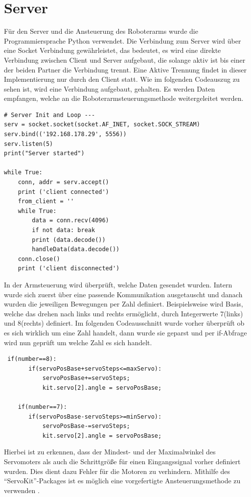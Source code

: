\documentclass[12pt,					%
							 oneside,			%
							 a4paper,			%
							 halfparskip,		%
							 liststotoc,			%
							 bibtotoc,			%
							 fleqn,				%
							 pointlessnumbers]	%
							 {scrreprt}
\begin{document}
\section{Server}
Für den Server und die Ansteuerung des Roboterarms wurde die Programmiersprache Python verwendet\cite{PiHandbuch}. Die Verbindung zum Server wird über eine Socket Verbindung gewährleistet, das bedeutet, es wird eine direkte Verbindung zwischen Client und Server aufgebaut, die solange aktiv ist bis einer der beiden Partner die Verbindung trennt. Eine Aktive Trennung findet in dieser Implementierung nur durch den Client statt. Wie im folgenden Codeauszug zu sehen ist, wird eine Verbindung aufgebaut, gehalten. Es werden Daten empfangen, welche an die Roboterarmsteuerungsmethode weitergeleitet werden.
\begin{lstlisting}
# Server Init and Loop ---
serv = socket.socket(socket.AF_INET, socket.SOCK_STREAM)
serv.bind(('192.168.178.29', 5556))
serv.listen(5)
print("Server started")

while True:
    conn, addr = serv.accept()
    print ('client connected')
    from_client = ''
    while True:
        data = conn.recv(4096)
        if not data: break
        print (data.decode())
        handleData(data.decode())
    conn.close()
    print ('client disconnected')
\end{lstlisting}


In der Armsteuerung wird überprüft, welche Daten gesendet wurden. Intern wurde sich zuerst über eine passende Kommunikation ausgetauscht und danach wurden die jeweiligen Bewegungen per Zahl definiert. Beispielsweise wird Basis, welche das drehen nach links und rechts ermöglicht, durch Integerwerte 7(links) und 8(rechts) definiert. Im folgenden Codeausschnitt wurde vorher überprüft ob es sich wirklich um eine Zahl handelt, dann wurde sie geparst und per \glqq{}if\grqq{}-Abfrage wird nun geprüft um welche Zahl es sich handelt. 
\newpage
\begin{lstlisting}
 if(number==8):
       if(servoPosBase+servoSteps<=maxServo):           
           servoPosBase+=servoSteps;
           kit.servo[2].angle = servoPosBase;
        
    if(number==7):
       if(servoPosBase-servoSteps>=minServo):           
           servoPosBase-=servoSteps;
           kit.servo[2].angle = servoPosBase;
\end{lstlisting}
Hierbei ist zu erkennen, dass der Mindest- und der Maximalwinkel des Servomoters als auch die Schrittgröße für einen Eingangssignal vorher definiert wurden. Dies dient dazu Fehler für die Motoren zu verhindern.  Mithilfe des ``ServoKit''-Packages ist es möglich eine vorgefertigte Ansteuerungsmethode zu verwenden \cite{Foundation2020}.
\end{document}
